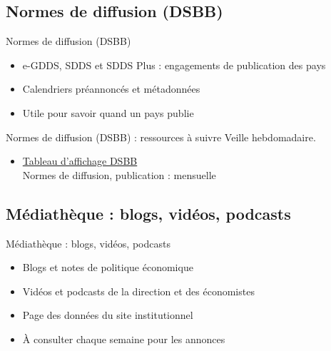 \documentclass[aspectratio=169,11pt]{beamer}
\begin{document}
\subsection{Normes de diffusion (DSBB)}
\begin{frame}{Normes de diffusion (DSBB)}
\begin{itemize}
\item e-GDDS, SDDS et SDDS Plus : engagements de publication des pays
\item Calendriers préannoncés et métadonnées
\item Utile pour savoir quand un pays publie
\end{itemize}
\end{frame}

\begin{frame}{Normes de diffusion (DSBB) : ressources à suivre}
\small
Veille hebdomadaire.
\begin{itemize}
\item \href{https://dsbb.imf.org}{Tableau d'affichage DSBB}\\{\footnotesize Normes de diffusion, publication : mensuelle}
\end{itemize}
\end{frame}

\subsection{Médiathèque : blogs, vidéos, podcasts}
\begin{frame}{Médiathèque : blogs, vidéos, podcasts}
\begin{itemize}
\item Blogs et notes de politique économique
\item Vidéos et podcasts de la direction et des économistes
\item Page des données du site institutionnel
\item À consulter chaque semaine pour les annonces
\end{itemize}
\end{frame}
\end{document}
